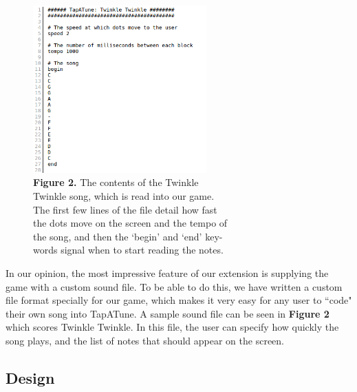 \documentclass[11pt]{article}
\begin{document}
\begin{figure}
  \vspace{-0.3em}
  \hspace*{1.5em}
  \includegraphics[width=18em]{song}
  \setlength{\belowcaptionskip}{-1.4em}
  \captionsetup{justification=justified,singlelinecheck=false}
  \caption*{\hspace*{1.4em}\fontsize{9}{9}\selectfont\textbf{Figure 2.} The contents of the Twinkle \\\hspace*{1.6em}Twinkle song, which is read into our game.\\\hspace*{1.6em}The first few lines of the file detail how fast\\\hspace*{1.6em}the dots move on the screen and the tempo of\\\hspace*{1.6em}the song, and then the `begin' and `end' key-\\\hspace*{1.7em}words signal when to start reading the notes. }
\end{figure}

In our opinion, the most impressive feature of our extension is supplying the game with a custom sound file. To be able to do this, we have written a custom file format specially for our game, which makes it very easy for any user to ``code" their own song into TapATune. A sample sound file can be seen in \textbf{Figure 2} which scores Twinkle Twinkle. In this file, the user can specify how quickly the song plays, and the list of notes that should appear on the screen.

\subsection{Design}
\end{document}
